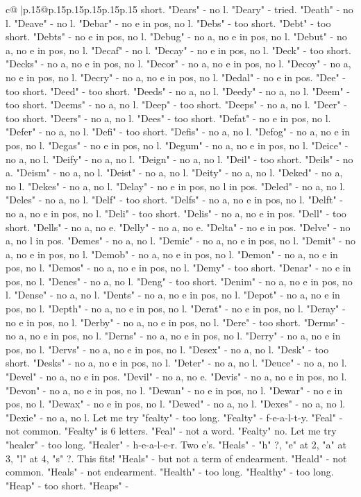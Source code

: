 \documentclass{article}
\begin{document}
{\begin{supertabular}{c@{$\;$}|p{.15\linewidth}@{}p{.15\linewidth}p{.15\linewidth}p{.15\linewidth}p{.15\linewidth}p{.15\linewidth}}
{{{short. "Dears" {-} no l. "Deary" {-} tried. "Death" {-} no l. "Deave" {-} no l. "Debar" {-} no e in pos, no l. "Debs" {-} too short. "Debt" {-} too short. "Debts" {-} no e in pos, no l. "Debug" {-} no a, no e in pos, no l. "Debut" {-} no a, no e in pos, no l. "Decaf" {-} no l. "Decay" {-} no e in pos, no l. "Deck" {-} too short. "Decks" {-} no a, no e in pos, no l. "Decor" {-} no a, no e in pos, no l. "Decoy" {-} no a, no e in pos, no l. "Decry" {-} no a, no e in pos, no l. "Dedal" {-} no e in pos. "Dee" {-} too short. "Deed" {-} too short. "Deeds" {-} no a, no l. "Deedy" {-} no a, no l. "Deem" {-} too short. "Deems" {-} no a, no l. "Deep" {-} too short. "Deeps" {-} no a, no l. "Deer" {-} too short. "Deers" {-} no a, no l. "Dees" {-} too short. "Defat" {-} no e in pos, no l. "Defer" {-} no a, no l. "Defi" {-} too short. "Defis" {-} no a, no l. "Defog" {-} no a, no e in pos, no l. "Degas" {-} no e in pos, no l. "Degum" {-} no a, no e in pos, no l. "Deice" {-} no a, no l. "Deify" {-} no a, no l. "Deign" {-} no a, no l. "Deil" {-} too short. "Deils" {-} no a. "Deism" {-} no a, no l. "Deist" {-} no a, no l. "Deity" {-} no a, no l. "Deked" {-} no a, no l. "Dekes" {-} no a, no l. "Delay" {-} no e in pos, no l in pos. "Deled" {-} no a, no l. "Deles" {-} no a, no l. "Delf" {-} too short. "Delfs" {-} no a, no e in pos, no l. "Delft" {-} no a, no e in pos, no l. "Deli" {-} too short. "Delis" {-} no a, no e in pos. "Dell" {-} too short. "Dells" {-} no a, no e. "Delly" {-} no a, no e. "Delta" {-} no e in pos. "Delve" {-} no a, no l in pos. "Demes" {-} no a, no l. "Demic" {-} no a, no e in pos, no l. "Demit" {-} no a, no e in pos, no l. "Demob" {-} no a, no e in pos, no l. "Demon" {-} no a, no e in pos, no l. "Demos" {-} no a, no e in pos, no l. "Demy" {-} too short. "Denar" {-} no e in pos, no l. "Denes" {-} no a, no l. "Deng" {-} too short. "Denim" {-} no a, no e in pos, no l. "Dense" {-} no a, no l. "Dents" {-} no a, no e in pos, no l. "Depot" {-} no a, no e in pos, no l. "Depth" {-} no a, no e in pos, no l. "Derat" {-} no e in pos, no l. "Deray" {-} no e in pos, no l. "Derby" {-} no a, no e in pos, no l. "Dere" {-} too short. "Derms" {-} no a, no e in pos, no l. "Derns" {-} no a, no e in pos, no l. "Derry" {-} no a, no e in pos, no l. "Dervs" {-} no a, no e in pos, no l. "Desex" {-} no a, no l. "Desk" {-} too short. "Desks" {-} no a, no e in pos, no l. "Deter" {-} no a, no l. "Deuce" {-} no a, no l. "Devel" {-} no a, no e in pos. "Devil" {-} no a, no e. "Devis" {-} no a, no e in pos, no l. "Devon" {-} no a, no e in pos, no l. "Dewan" {-} no e in pos, no l. "Dewar" {-} no e in pos, no l. "Dewax" {-} no e in pos, no l. "Dewed" {-} no a, no l. "Dexes" {-} no a, no l. "Dexie" {-} no a, no l. Let me try "fealty" {-} too long. "Fealty" {-} f{-}e{-}a{-}l{-}t{-}y. "Feal" {-} not common. "Fealty" is 6 letters. "Feal" {-} not a word. "Fealty" no. Let me try "healer" {-} too long. "Healer" {-} h{-}e{-}a{-}l{-}e{-}r. Two e's. "Heals" {-} "h" ?, "e" at 2, "a" at 3, "l" at 4, "s" ?. This fits! "Heals" {-} but not a term of endearment. "Heald" {-} not common. "Heals" {-} not endearment. "Health" {-} too long. "Healthy" {-} too long. "Heap" {-} too short. "Heaps" {-} }}}
\end{supertabular}}
\end{document}
